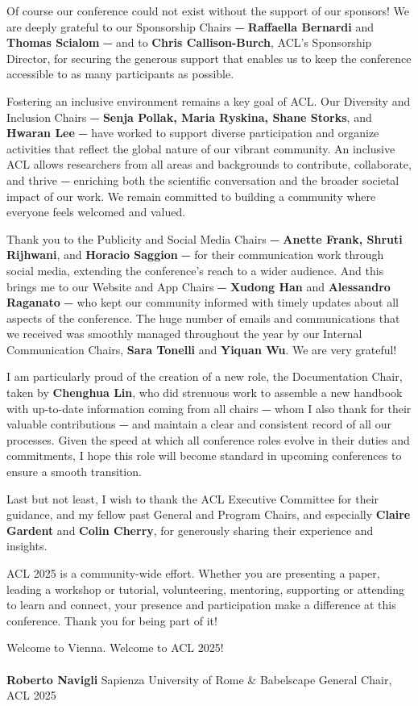 Of course our conference could not exist without the support of our sponsors! We are deeply grateful to our Sponsorship Chairs ⏤ \textbf{Raffaella Bernardi} and \textbf{Thomas Scialom} ⏤ and to \textbf{Chris Callison-Burch}, ACL’s Sponsorship Director, for securing the generous support that enables us to keep the conference accessible to as many participants as possible.

Fostering an inclusive environment remains a key goal of ACL. Our Diversity and Inclusion Chairs ⏤ \textbf{Senja Pollak, Maria Ryskina, Shane Storks}, and \textbf{Hwaran Lee} ⏤ have worked to support diverse participation and organize activities that reflect the global nature of our vibrant community. An inclusive ACL allows researchers from all areas and backgrounds to contribute, collaborate, and thrive ⏤ enriching both the scientific conversation and the broader societal impact of our work. We remain committed to building a community where everyone feels welcomed and valued.

Thank you to the Publicity and Social Media Chairs ⏤ \textbf{Anette Frank, Shruti Rijhwani}, and \textbf{Horacio Saggion} ⏤ for their communication work through social media, extending the conference’s reach to a wider audience. And this brings me to our Website and App Chairs ⏤ \textbf{Xudong Han} and \textbf{Alessandro Raganato} ⏤ who kept our community informed with timely updates about all aspects of the conference. The huge number of emails and communications that we received was smoothly managed throughout the year by our Internal Communication Chairs, \textbf{Sara Tonelli} and \textbf{Yiquan Wu}. We are very grateful!

I am particularly proud of the creation of a new role, the Documentation Chair, taken by \textbf{Chenghua Lin}, who did strenuous work to assemble a new handbook with up-to-date information coming from all chairs ⏤ whom I also thank for their valuable contributions ⏤ and maintain a clear and consistent record of all our processes. Given the speed at which all conference roles evolve in their duties and commitments, I hope this role will become standard in upcoming conferences to ensure a smooth transition.

Last but not least, I wish to thank the ACL Executive Committee for their guidance, and my fellow past General and Program Chairs, and especially \textbf{Claire Gardent} and \textbf{Colin Cherry}, for generously sharing their experience and insights.

ACL 2025 is a community-wide effort. Whether you are presenting a paper, leading a workshop or tutorial, volunteering, mentoring, supporting or attending to learn and connect, your presence and participation make a difference at this conference. Thank you for being part of it!

Welcome to Vienna. Welcome to ACL 2025!\\
\\
\textbf{Roberto Navigli}
Sapienza University of Rome & Babelscape
General Chair, ACL 2025
